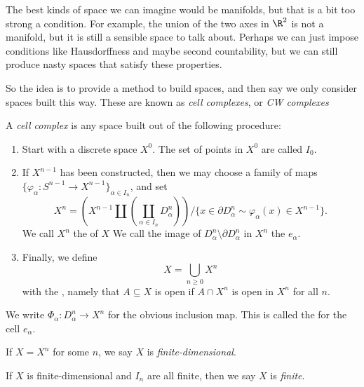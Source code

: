 \documentclass[a4paper]{article}
\begin{document}
The best kinds of space we can imagine would be manifolds, but that is a bit too strong a condition. For example, the union of the two axes in $\R^2$ is not a manifold, but it is still a sensible space to talk about. Perhaps we can just impose conditions like Hausdorffness and maybe second countability, but we can still produce nasty spaces that satisfy these properties.

So the idea is to provide a method to build spaces, and then say we only consider spaces built this way. These are known as \emph{cell complexes}, or \emph{CW complexes}

\begin{defi}
  A \emph{cell complex} is any space built out of the following procedure:
  \begin{enumerate}
    \item Start with a discrete space $X^0$. The set of points in $X^0$ are called $I_0$.
    \item If $X^{n - 1}$ has been constructed, then we may choose a family of maps $\{\varphi_\alpha: S^{n - 1} \to X^{n - 1}\}_{\alpha \in I_n}$, and set
      \[
        X^n = \left(X^{n - 1} \amalg \left(\coprod_{\alpha \in I_n} D_\alpha^n\right) \right)/\{x \in \partial D_\alpha^n \sim \varphi_\alpha(x) \in X^{n - 1}\}.
      \]
      We call $X^n$ the  of $X$ We call the image of $D_\alpha^n \setminus \partial D_\alpha^n$ in $X^n$ the  $e_\alpha$.
    \item Finally, we define
      \[
        X = \bigcup_{n \geq 0} X^n
      \]
      with the , namely that $A \subseteq X$ is open if $A \cap X^n$ is open in $X^n$ for all $n$.
  \end{enumerate}
\end{defi}
We write $\Phi_\alpha: D_\alpha^n \to X^n$ for the obvious inclusion map. This is called the  for the cell $e_\alpha$.

\begin{defi}
  If $X = X^n$ for some $n$, we say $X$ is \emph{finite-dimensional}.
\end{defi}

\begin{defi}
  If $X$ is finite-dimensional and $I_n$ are all finite, then we say $X$ is \emph{finite}.
\end{defi}
\end{document}
